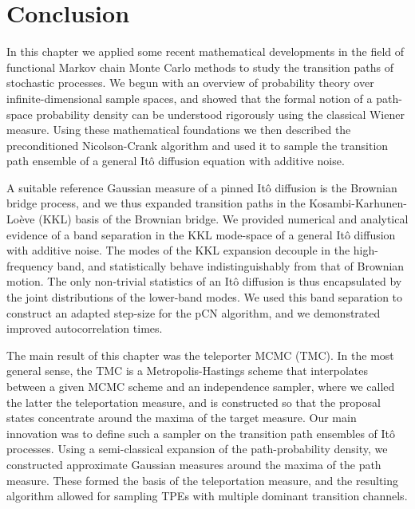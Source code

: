 
\section{Conclusion}

In this chapter we applied some recent mathematical developments in the field of functional Markov chain Monte Carlo methods to study the transition paths of stochastic processes. We begun with an overview of probability theory over infinite-dimensional sample spaces, and showed that the formal notion of a path-space probability density can be understood rigorously using the classical Wiener measure. Using these mathematical foundations we then described the preconditioned Nicolson-Crank algorithm and used it to sample the transition path ensemble of a general It\^{o} diffusion equation with additive noise.

A suitable reference Gaussian measure of a pinned It\^{o} diffusion is the Brownian bridge process, and we thus expanded transition paths in the Kosambi-Karhunen-Lo\`eve (KKL) basis of the Brownian bridge. We provided numerical and analytical evidence of a band separation in the KKL mode-space of a general It\^{o} diffusion with additive noise. The modes of the KKL expansion decouple in the high-frequency band, and statistically behave indistinguishably from that of Brownian motion. The only non-trivial statistics of an It\^{o} diffusion is thus encapsulated by the joint distributions of the lower-band modes. We used this band separation to construct an adapted step-size for the pCN algorithm, and we demonstrated improved autocorrelation times.

The main result of this chapter was the teleporter MCMC (TMC). In the most general sense, the TMC is a Metropolis-Hastings scheme that interpolates between a given MCMC scheme and an independence sampler, where we called the latter the teleportation measure, and is constructed so that the proposal states concentrate around the maxima of the target measure. Our main innovation was to define such a sampler on the transition path ensembles of It\^{o} processes. Using a semi-classical expansion of the path-probability density, we constructed approximate Gaussian measures around the maxima of the path measure. These formed the basis of the teleportation measure, and the resulting algorithm allowed for sampling TPEs with multiple dominant transition channels.

